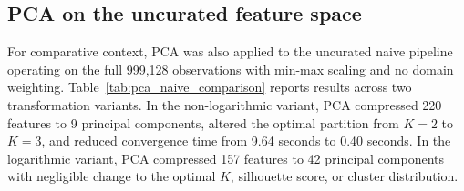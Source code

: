 \subsection{PCA on the uncurated feature space}
\label{sec:results_pca_naive}

For comparative context, PCA was also applied to the uncurated naive pipeline operating on the full 999,128 observations with min-max scaling and no domain weighting.
Table~\ref{tab:pca_naive_comparison} reports results across two transformation variants. In the non-logarithmic variant, PCA compressed 220 features to 9 principal components, altered the optimal partition from $K=2$ to $K=3$, and reduced convergence time from 9.64 seconds to 0.40 seconds.
In the logarithmic variant, PCA compressed 157 features to 42 principal components with negligible change to the optimal $K$, silhouette score, or cluster distribution.
\begin{table}[H]
    \centering
    \renewcommand{\arraystretch}{1.3}
    \caption{$K$-means performance on the uncurated naive pipeline (full 999,128 observations, min-max scaling, no domain weighting): standard feature space versus PCA-reduced space, across non-logarithmic and logarithmic transformation variants.}
    \label{tab:pca_naive_comparison}
\end{table}

